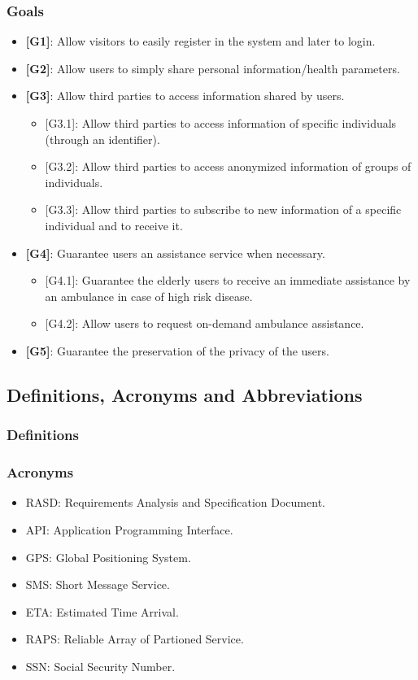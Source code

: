 \documentclass[12pt,a4paper]{article}
\begin{document}
	\subsubsection{Goals}
	\begin{itemize}
		\item {\textbf[}\textbf{G1}{\textbf]}: Allow visitors to easily register in the system and later to login.
		\item {\textbf[}\textbf{G2}{\textbf]}: Allow users to simply share personal information/health parameters.
		\item {\textbf[}\textbf{G3}{\textbf]}: Allow third parties to access information shared by users.
		\begin{itemize}
			\item {[G3.1]}: Allow third parties to access information of specific individuals (through an identifier).
			\item {[G3.2]}: Allow third parties to access anonymized information of groups of individuals.
			\item {[G3.3]}: Allow third parties to subscribe to new information of a specific individual and to receive it.
		\end{itemize}
		\item {\textbf[}\textbf{G4}{\textbf]}: Guarantee users an assistance service when necessary.
			\begin{itemize}
				\item {[}{G4.1}{]}: Guarantee the elderly users to receive an immediate assistance by an ambulance in case of high risk disease.
				\item {[}{G4.2}{]}: Allow users to request on-demand ambulance assistance.
			\end{itemize}
		\item {\textbf[}\textbf{G5}{\textbf]}: Guarantee the preservation of the privacy of the users.
	\end{itemize}


	\subsection{Definitions, Acronyms and Abbreviations}
	\subsubsection{Definitions}
	\subsubsection{Acronyms}
	\begin{itemize}
		\item RASD: Requirements Analysis and Specification Document.
		\item API: Application Programming Interface.
		\item GPS: Global Positioning System.
		\item SMS: Short Message Service.
		\item ETA: Estimated Time Arrival.
		\item RAPS: Reliable Array of Partioned Service.
		\item SSN: Social Security Number.
	\end{itemize}
\end{document}

